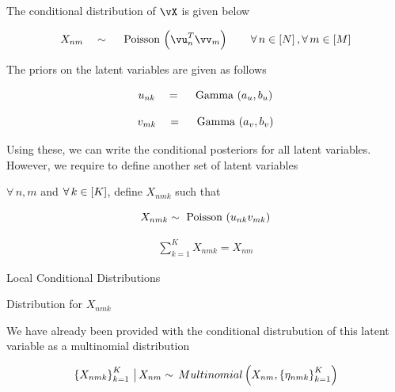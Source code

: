 \documentclass{article}
\begin{document}
\makeheader%

\begin{question}
	
	The conditional distribution of $\vX$ is given below

	\begin{equation}
		X_{nm}	\qsim	\func{\mt{Poisson}}{\vu_n^T \vv_m}	 \quad \quad \forall\, n \in \brac{N}, \forall\, m \in \brac{M}
		\label{eq:xnm}
	\end{equation}

	The priors on the latent variables are given as follows

	\begin{equation}
		u_{nk}	\eq	\func{\mt{Gamma}}{a_u, b_u}
		\label{eq:unkp}
	\end{equation}

	\begin{equation}
		v_{mk}	\eq	\func{\mt{Gamma}}{a_v, b_v}
		\label{eq:vmkp}
	\end{equation} \br%

	 \br%

	Using these, we can write the conditional posteriors for all latent variables. However, we require to define another set of latent variables \br%

	$\forall\, n, m$ and $\forall\, k \in \left[ K \right]$, define $X_{nmk}$ such that

	\begin{equation}
		X_{nmk}	\sim	\func{\mt{Poisson}}{u_{nk} v_{mk}}
		\label{eq:xnmkp}
	\end{equation}

	\begin{align*}
		\sum_{k = 1}^K X_{nmk} = X_{nm}
	\end{align*}

	\begin{qsection}{Local Conditional Distributions}

		\begin{qsubsection}{Distribution for $X_{nmk}$}

			We have already been provided with the conditional distrubution of this latent variable as a multinomial distribution

			\begin{equation}
				\set{X_{nmk}}_{k = 1}^K \pipe X_{nm}	\sim	\func{Multinomial}{X_{nm}, \set{\eta_{nmk}}_{k = 1}^K}
				\label{eq:xnmkpo}
			\end{equation}


\end{qsubsection}
\end{qsection}
\end{question}
\end{document}
